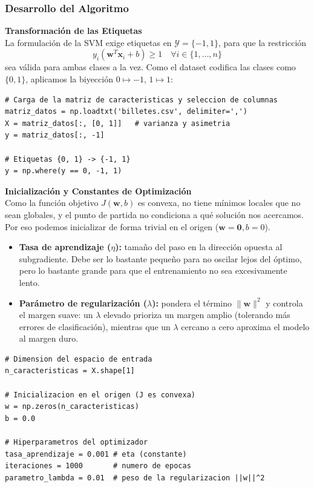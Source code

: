 \documentclass[12pt, a4paper]{article}
\begin{document}
\subsubsection{Desarrollo del Algoritmo}

\noindent \textbf{Transformación de las Etiquetas} \\

\noindent La formulación de la SVM exige etiquetas en $\mathcal{Y} = \{-1, 1\}$, para que la restricción
\[ y_i (\mathbf{w}^T \mathbf{x}_i + b) \geq 1 \quad \forall i \in \{1, \dots, n\} \]
sea válida para ambas clases a la vez. Como el dataset codifica las clases como $\{0, 1\}$, aplicamos la biyección $0 \mapsto -1$, $1 \mapsto 1$:

\begin{lstlisting}
# Carga de la matriz de caracteristicas y seleccion de columnas
matriz_datos = np.loadtxt('billetes.csv', delimiter=',')
X = matriz_datos[:, [0, 1]]   # varianza y asimetria
y = matriz_datos[:, -1]

# Etiquetas {0, 1} -> {-1, 1}
y = np.where(y == 0, -1, 1)
\end{lstlisting}

\noindent \textbf{Inicialización y Constantes de Optimización} \\

\noindent Como la función objetivo $J(\mathbf{w}, b)$ es convexa, no tiene mínimos locales que no sean globales, y el punto de partida no condiciona a qué solución nos acercamos. Por eso podemos inicializar de forma trivial en el origen ($\mathbf{w} = \mathbf{0}, b = 0$).

\begin{itemize}
    \item \textbf{Tasa de aprendizaje ($\eta$):} tamaño del paso en la dirección opuesta al subgradiente. Debe ser lo bastante pequeño para no oscilar lejos del óptimo, pero lo bastante grande para que el entrenamiento no sea excesivamente lento.
    \item \textbf{Parámetro de regularización ($\lambda$):} pondera el término $\|\mathbf{w}\|^2$ y controla el margen suave: un $\lambda$ elevado prioriza un margen amplio (tolerando más errores de clasificación), mientras que un $\lambda$ cercano a cero aproxima el modelo al margen duro.
\end{itemize}

\begin{lstlisting}
# Dimension del espacio de entrada
n_caracteristicas = X.shape[1]

# Inicializacion en el origen (J es convexa)
w = np.zeros(n_caracteristicas)
b = 0.0

# Hiperparametros del optimizador
tasa_aprendizaje = 0.001 # eta (constante)
iteraciones = 1000       # numero de epocas
parametro_lambda = 0.01  # peso de la regularizacion ||w||^2
\end{lstlisting}
\end{document}
